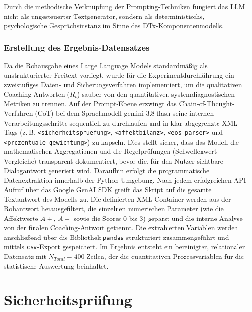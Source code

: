 Durch die methodische Verknüpfung der Prompting-Techniken fungiert das LLM nicht als ungesteuerter Textgenerator, sondern als deterministische, psychologische Gesprächsinstanz im Sinne des DTx-Komponentenmodells.


\subsubsection{Erstellung des Ergebnis-Datensatzes}
Da die Rohausgabe eines Large Language Models standardmäßig als unstrukturierter Freitext vorliegt, wurde für die Experimentdurchführung ein zweistufiges Daten- und Sicherungsverfahren implementiert, um die qualitativen Coaching-Antworten ($R_t$) sauber von den quantitativen systemdiagnostischen Metriken zu trennen. 
Auf der Prompt-Ebene erzwingt das Chain-of-Thought-Verfahren (CoT) bei dem Sprachmodell gemini-3.8-flash seine internen Verarbeitungsschritte sequentiell zu durchlaufen und in klar abgegrenzte XML-Tags (z.\,B. \texttt{<sicherheitspruefung>}, \texttt{<affektbilanz>}, \texttt{<eos\_parser>} und \texttt{<prozentuale\_gewichtung>}) zu kapseln. Dies stellt sicher, dass das Modell die mathematischen Aggregationen und die Regelprüfungen (Schwellenwert-Vergleiche) transparent dokumentiert, bevor die, für den Nutzer sichtbare Dialogantwort generiert wird.
Daraufhin erfolgt die programmatische Datenextraktion innerhalb der Python-Umgebung. Nach jedem erfolgreichen API-Aufruf über das Google GenAI SDK greift das Skript auf die gesamte Textantwort des Modells zu. Die definierten XML-Container werden aus der Rohantwort herausgefiltert, die einzelnen numerischen Parameter (wie die Affektwerte $A+$, $A-$ sowie die Scores $0$ bis $3$) geparst und die interne Analyse von der finalen Coaching-Antwort getrennt. Die extrahierten Variablen werden anschließend über die Bibliothek \texttt{pandas} strukturiert zusammengeführt und mittels \texttt{csv}-Export gespeichert. Im Ergebnis entsteht ein bereinigter, relationaler Datensatz mit $N_{Total} = 400$ Zeilen, der die quantitativen Prozessvariablen für die statistische Auswertung beinhaltet.


\section{Sicherheitsprüfung}

